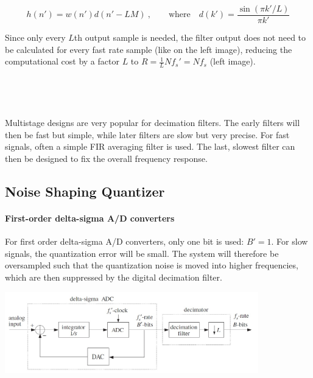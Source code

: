 \begin{equation*}
	h(n') = w(n') d(n'-LM) \:,\qquad \text{where} \quad
	d(k') = \frac{\sin(\pi k'/L)}{\pi k'}
\end{equation*}

Since only every $L$th output sample is needed, the filter output does
not need to be calculated for every fast rate sample (like on the left image),
reducing the computational cost by a factor $L$ to
$R = \frac{1}{L} N f_s' = N f_s$ (left image). \\

\begin{multicols}{2}
	\begin{center}
		 \\
	\end{center}
\vfill\columnbreak
	\begin{center}
		 \\
	\end{center}
\end{multicols}

Multistage designs are very popular for decimation filters. The early filters will
then be fast but simple, while later filters are slow but very precise. For fast
signals, often a simple FIR averaging filter is used. The last, slowest filter
can then be designed to fix the overall frequency response.


\subsection{Noise Shaping Quantizer}

\paragraph{First-order delta-sigma A/D converters}
For first order delta-sigma A/D converters, only one bit is used: $B'=1$. For
slow signals, the quantization error will be small. The system will therefore
be oversampled such that the quantization noise is moved into higher frequencies,
which are then suppressed by the digital decimation filter.

\begin{center}
	\includegraphics[width=11cm]{images/IntDecOv_SigmaDelta.jpg}
\end{center}

